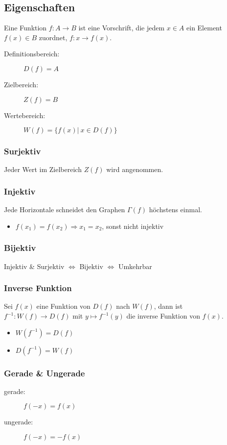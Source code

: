 \subsection{Eigenschaften}
    Eine Funktion $f : A \to B$ ist eine Vorschrift, die jedem $x \in A$ ein Element $f(x) \in B$ zuordnet, $f: x \to f(x)$.
    \begin{description}
        \item[Definitionsbereich:] $D(f) = A$
        \item[Zielbereich:] $Z(f) = B$
        \item[Wertebereich:] $W(f) = \{ f(x) \vert \ x \in D(f)\}$   
    \end{description}
    \subsubsection{Surjektiv}
        Jeder Wert im Zielbereich $Z(f)$ wird angenommen.
    \subsubsection{Injektiv}
        Jede Horizontale schneidet den Graphen $\Gamma(f)$ höchstens einmal.
        \begin{itemize}
            \item $f(x_1) = f(x_2) \Rightarrow x_1 = x_2$, sonst nicht injektiv
        \end{itemize}
    \subsubsection{Bijektiv}
        \begin{center}
            Injektiv \& Surjektiv $\Leftrightarrow$ Bijektiv $\Leftrightarrow$ Umkehrbar
        \end{center}
    \subsubsection{Inverse Funktion}
        Sei $f(x)$ eine Funktion von $D(f)$ nach $W(f)$, dann ist $f^{-1}: W(f) \to D(f)$ mit $y \mapsto f^{-1}(y)$ die inverse Funktion von $f(x)$.
        \begin{itemize}
            \item $W(f^{-1}) = D(f)$
            \item $D(f^{-1}) = W(f)$
        \end{itemize}
    \subsubsection{Gerade \& Ungerade}
        \begin{description}
            \item[gerade:]\phantom{as} $f(-x) = f(x)$ 
            \item[ungerade:] $f(-x) = -f(x)$ 
        \end{description}
